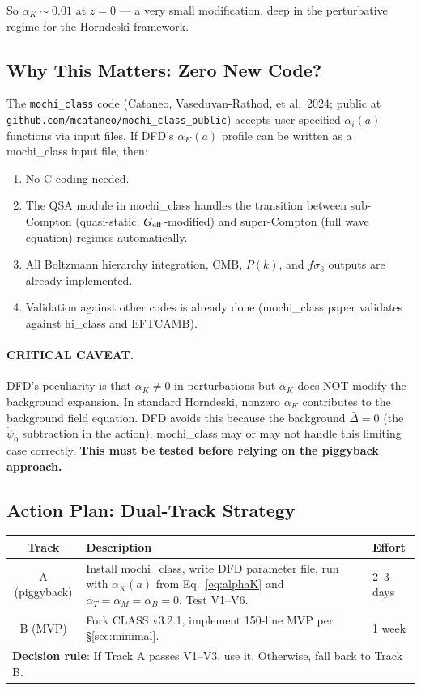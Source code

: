 \documentclass[11pt]{article}
\theoremstyle{definition}
\theoremstyle{remark}
\newcommand{\Geff}{G_{\rm eff}}
\begin{document}
So $\alpha_K \sim 0.01$ at $z = 0$ --- a very small modification, deep
in the perturbative regime for the Horndeski framework.

\subsection{Why This Matters: Zero New Code?}

The \texttt{mochi\_class} code (Cataneo, Vaseduvan-Rathod, et al.\ 2024;
public at \texttt{github.com/mcataneo/mochi\_class\_public}) accepts
user-specified $\alpha_i(a)$ functions via input files. If DFD's
$\alpha_K(a)$ profile can be written as a mochi\_class input file,
then:

\begin{enumerate}
\item No C coding needed.
\item The QSA module in mochi\_class handles the transition between
  sub-Compton (quasi-static, $\Geff$-modified) and super-Compton
  (full wave equation) regimes automatically.
\item All Boltzmann hierarchy integration, CMB, $P(k)$, and $f\sigma_8$
  outputs are already implemented.
\item Validation against other codes is already done (mochi\_class
  paper validates against hi\_class and EFTCAMB).
\end{enumerate}

\paragraph{CRITICAL CAVEAT.}
DFD's peculiarity is that $\alpha_K \neq 0$ in perturbations
but $\alpha_K$ does NOT modify the background expansion.
In standard Horndeski, nonzero $\alpha_K$ contributes to the
background field equation. DFD avoids this because the background
$\bar\Delta = 0$ (the $\dot\psi_0$ subtraction in the action).
mochi\_class may or may not handle this limiting case correctly.
\textbf{This must be tested before relying on the piggyback approach.}

\subsection{Action Plan: Dual-Track Strategy}

\begin{center}
\begin{tabular}{cp{5cm}p{5cm}}
\toprule
Track & Description & Effort \\
\midrule
A (piggyback) & Install mochi\_class, write DFD parameter file,
  run with $\alpha_K(a)$ from Eq.~\eqref{eq:alphaK} and
  $\alpha_T = \alpha_M = \alpha_B = 0$. Test V1--V6. & 2--3 days \\
B (MVP) & Fork CLASS v3.2.1, implement 150-line MVP per \S\ref{sec:minimal}. & 1 week \\
\midrule
\multicolumn{3}{l}{\textbf{Decision rule}: If Track A passes V1--V3,
  use it. Otherwise, fall back to Track B.} \\
\bottomrule
\end{tabular}
\end{center}
\end{document}
